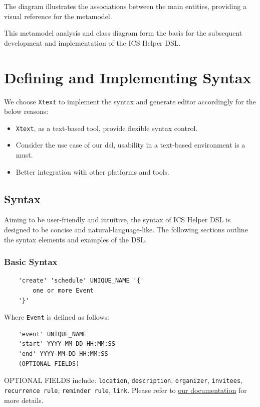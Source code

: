 \documentclass[12pt, letterpaper, twoside]{article}
\begin{document}
The diagram illustrates the associations between the main entities, providing a visual reference for the metamodel.

This metamodel analysis and class diagram form the basis for the subsequent development and implementation of the ICS Helper DSL.


\newpage
\section{Defining and Implementing Syntax}
We choose \texttt{Xtext} to implement the syntax and generate editor accordingly for the below reasons:

\begin{itemize}
    \item \texttt{Xtext}, as a text-based tool, provide flexible syntax control.
    \item Consider the use case of our dsl, usability in a text-based environment is a must.
    \item Better integration with other platforms and tools.
\end{itemize}

\subsection{Syntax}
Aiming to be user-friendly and intuitive, the syntax of ICS Helper DSL is designed to be concise and natural-language-like. 
The following sections outline the syntax elements and examples of the DSL.
\subsubsection{Basic Syntax}
\begin{verbatim}
    'create' 'schedule' UNIQUE_NAME '{'
        one or more Event
    '}'
\end{verbatim}

Where \texttt{Event} is defined as follows:

\begin{verbatim}
    'event' UNIQUE_NAME
    'start' YYYY-MM-DD HH:MM:SS
    'end' YYYY-MM-DD HH:MM:SS
    (OPTIONAL FIELDS)
\end{verbatim}
OPTIONAL FIELDS include: \texttt{location}, \texttt{description}, \texttt{organizer}, \texttt{invitees}, \texttt{recurrence rule}, \texttt{reminder rule}, \texttt{link}. 
Please refer to \href{https://github.com/Gudauu/ICS-Helper}{our documentation} for more details.
\end{document}
